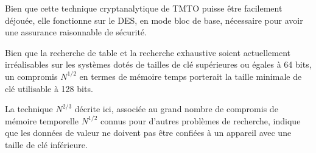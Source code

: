 		\bigskip

		Bien que cette technique cryptanalytique de \gls{TMTO} puisse être facilement déjouée, elle fonctionne sur le DES, en mode bloc de base, nécessaire pour avoir une assurance raisonnable de sécurité.

		\bigskip

		Bien que la recherche de table et la recherche exhaustive soient actuellement irréalisables sur les systèmes dotés de tailles de clé supérieures ou égales à 64 bits, un compromis $N^{1/2}$ en termes de mémoire temps porterait la taille minimale de clé utilisable à 128 bits.

		\bigskip

		La technique $N^{2/3}$ décrite ici, associée au grand nombre de compromis de mémoire temporelle $N^{1/2}$ connus pour d’autres problèmes de recherche, indique que les données de valeur ne doivent pas être confiées à un appareil avec une taille de clé inférieure.

\endinput{}
